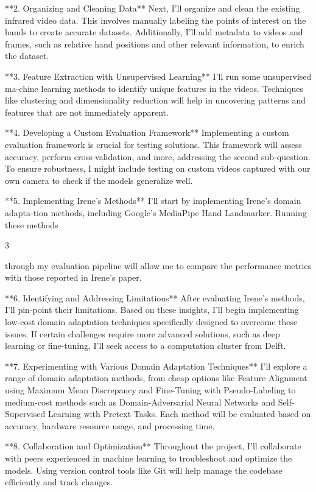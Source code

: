 \documentclass[
]{article}
\begin{document}
**2. Organizing and Cleaning Data** Next, I'll organize and clean the
existing infrared video data. This involves manually labeling the points
of interest on the hands to create accurate datasets. Additionally, I'll
add metadata to videos and frames, such as relative hand positions and
other relevant information, to enrich the dataset.

**3. Feature Extraction with Unsupervised Learning** I'll run some
unsupervised ma-chine learning methods to identify unique features in
the videos. Techniques like clustering and dimensionality reduction will
help in uncovering patterns and features that are not immediately
apparent.

**4. Developing a Custom Evaluation Framework** Implementing a custom
evaluation framework is crucial for testing solutions. This framework
will assess accuracy, perform cross-validation, and more, addressing the
second sub-question. To ensure robustness, I might include testing on
custom videos captured with our own camera to check if the models
generalize well.

**5. Implementing Irene's Methods** I'll start by implementing Irene's
domain adapta-tion methods, including Google's MediaPipe Hand
Landmarker. Running these methods

3

through my evaluation pipeline will allow me to compare the performance
metrics with those reported in Irene's paper.

**6. Identifying and Addressing Limitations** After evaluating Irene's
methods, I'll pin-point their limitations. Based on these insights, I'll
begin implementing low-cost domain adaptation techniques specifically
designed to overcome these issues. If certain challenges require more
advanced solutions, such as deep learning or fine-tuning, I'll seek
access to a computation cluster from Delft.

**7. Experimenting with Various Domain Adaptation Techniques** I'll
explore a range of domain adaptation methods, from cheap options like
Feature Alignment using Maximum Mean Discrepancy and Fine-Tuning with
Pseudo-Labeling to medium-cost methods such as Domain-Adversarial Neural
Networks and Self-Supervised Learning with Pretext Tasks. Each method
will be evaluated based on accuracy, hardware resource usage, and
processing time.

**8. Collaboration and Optimization** Throughout the project, I'll
collaborate with peers experienced in machine learning to troubleshoot
and optimize the models. Using version control tools like Git will help
manage the codebase efficiently and track changes.
\end{document}
